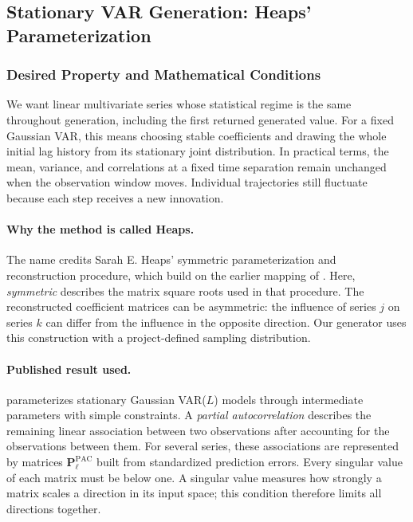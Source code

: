 \subsection{Stationary VAR Generation: Heaps' Parameterization}
\label{sec:implemented-heaps}

\subsubsection{Desired Property and Mathematical Conditions}
We want linear multivariate series whose statistical regime is the same
throughout generation, including the first returned generated value. For a
fixed Gaussian VAR, this means choosing stable coefficients and drawing
the whole initial lag history from its stationary joint distribution.
In practical terms, the mean, variance, and correlations at a fixed time
separation remain unchanged when the observation window moves. Individual
trajectories still fluctuate because each step receives a new innovation.

\paragraph{Why the method is called Heaps.}
The name credits Sarah E. Heaps' symmetric parameterization and reconstruction
procedure, which build on the earlier mapping of
\citet{ansley1986reparameterizing}. Here, \emph{symmetric} describes the matrix
square roots used in that procedure. The reconstructed coefficient matrices
can be asymmetric: the influence of series $j$ on series $k$ can differ from
the influence in the opposite direction. Our generator uses this construction
with a project-defined sampling distribution.

\paragraph{Published result used.}
\citet[Sections~2.1--2.2 and Appendix]{heaps2023stationarity} parameterizes
stationary Gaussian VAR($L$) models through intermediate parameters with
simple constraints. A \emph{partial autocorrelation} describes the remaining
linear association between two observations after accounting for the
observations between them. For several series, these associations are
represented by matrices $\mathbf P_\ell^{\mathrm{PAC}}$ built from standardized
prediction errors. Every singular value of each matrix must be below one.
A singular value measures how strongly a matrix scales a direction in its
input space; this condition therefore limits all directions together.

